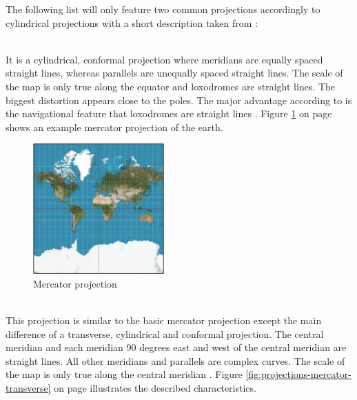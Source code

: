 The following list will only feature two common projections accordingly to cylindrical projections with a short description taken from \citeauthor{Snyder1987} :

\begin{enumerate}

 \hfill \\
It is a cylindrical, conformal projection where meridians are equally spaced straight lines, whereas parallels are unequally spaced straight lines. The scale of the map is only true along the equator and loxodromes are straight lines. The biggest distortion appears close to the poles. The major advantage according to \citeauthor{Snyder1987} is the navigational feature that loxodromes are straight lines . Figure \ref{fig:projections-mercator} on page \pageref{fig:projections-mercator} shows an example mercator projection of the earth.

\begin{figure}[!htb]
\centering
\includegraphics[height=5cm,keepaspectratio]{images/methods/projections/mercator.png}
\caption[
    Mercator projection, Urldate: 07.2016 \newline
    \small\texttt{\url{https://upload.wikimedia.org/wikipedia/commons/f/f0/MercNormSph.png}}.
]{Mercator projection}
\label{fig:projections-mercator}
\end{figure}


 \hfill \\
This projection is similar to the basic mercator projection except the main difference of a transverse, cylindrical and conformal projection. The central meridian and each meridian 90 degrees east and west of the central meridian are straight lines. All other meridians and parallels are complex curves. The scale of the map is only true along the central meridian . Figure \ref{fig:projections-mercator-transverse} on page \pageref{fig:projections-mercator-transverse} illustrates the described characteristics.


\end{enumerate}

